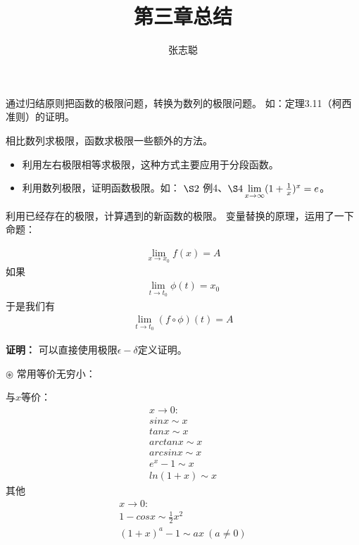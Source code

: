 \documentclass{article}
\begin{document}
\title{第三章总结}
\author{张志聪}
\maketitle

\begin{zremark}
  通过归结原则把函数的极限问题，转换为数列的极限问题。
  如：定理3.11（柯西准则）的证明。
\end{zremark}

\begin{zremark}
  相比数列求极限，函数求极限一些额外的方法。
\end{zremark}

\begin{itemize}
  \item 利用左右极限相等求极限，这种方式主要应用于分段函数。
  \item 利用数列极限，证明函数极限。如： $\S2$ 例4、$\S 4 \lim\limits_{x \to \infty} (1 + \frac{1}{x})^x = e$。
\end{itemize}

\begin{zremark}
  利用已经存在的极限，计算遇到的新函数的极限。
  变量替换的原理，运用了一下命题：

  \begin{align*}
    \lim\limits_{x \to x_0} f(x) = A
  \end{align*}
  如果
  \begin{align*}
    \lim\limits_{t \to t_0} \phi(t) = x_0
  \end{align*}
  于是我们有
  \begin{align*}
    \lim\limits_{t \to t_0} (f \circ \phi)(t) = A
  \end{align*}
\end{zremark}

\textbf{证明：}
可以直接使用极限$\epsilon - \delta$定义证明。

\begin{zremark}
  $\circledast$
  常用等价无穷小：

  与$x$等价：
  \begin{align*}
    x \to 0 :       \\
    sin x \sim x    \\
    tan x \sim x    \\
    arctan x \sim x \\
    arcsin x \sim x \\
    e^x - 1 \sim x  \\
    ln(1 + x) \sim x
  \end{align*}
  其他
  \begin{align*}
    x \to 0 :                    \\
    1 - cosx \sim \frac{1}{2}x^2 \\
    (1 + x)^a - 1 \sim a x \ (a \neq 0)
  \end{align*}
\end{zremark}
\end{document}
